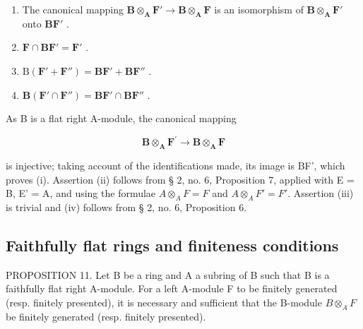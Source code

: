 \begin{enumerate}
\def\labelenumi{(\roman{enumi})}
\item
  The canonical mapping \(\mathbf{B} \otimes_{\mathbf{A}} \mathbf{F}' \to \mathbf{B} \otimes_{\mathbf{A}} \mathbf{F}\) is an isomorphism of \(\mathbf{B} \otimes_{\mathbf{A}} \mathbf{F}'\) onto \(\mathbf{BF}'\) .
\item
  \(\mathbf{F} \cap \mathbf{BF}' = \mathbf{F}'\) .
\item
  \(\mathrm{B}(\mathbf{F}' + \mathbf{F}'') = \mathbf{BF}' + \mathbf{BF}''\) .
\item
  \(\mathbf{B}(\mathbf{F}'\cap \mathbf{F}'')=\mathbf{B}\mathbf{F}'\cap \mathbf{B}\mathbf{F}''\) .
\end{enumerate}

As B is a flat right A-module, the canonical mapping

\[
\mathbf {B} \otimes_ {\mathbf {A}} \mathbf {F} ^ {\prime} \rightarrow \mathbf {B} \otimes_ {\mathbf {A}} \mathbf {F}
\]

is injective; taking account of the identifications made, its image is BF', which proves (i). Assertion (ii) follows from § 2, no. 6, Proposition 7, applied with E = B, E' = A, and using the formulae \(A \otimes_{A} F = F\) and \(A \otimes_{A} F' = F'\). Assertion (iii) is trivial and (iv) follows from § 2, no. 6, Proposition 6.

\subsection{Faithfully flat rings and finiteness conditions}

PROPOSITION 11. Let B be a ring and A a subring of B such that B is a faithfully flat right A-module. For a left A-module F to be finitely generated (resp. finitely presented), it is necessary and sufficient that the B-module \(B \otimes_{A} F\) be finitely generated (resp. finitely presented).

